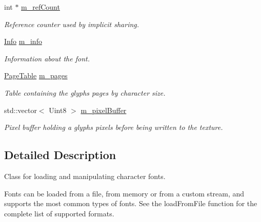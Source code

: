 \begin{DoxyCompactItemize}
int $\ast$ \mbox{\hyperlink{classsf_1_1_font_adc98033870d4eb40872e78eeac4e1c24}{m\+\_\+ref\+Count}}
\begin{DoxyCompactList}\small\item\em Reference counter used by implicit sharing. \end{DoxyCompactList}\item 
\mbox{\label{classsf_1_1_font_a22f08c57808a1621269e6f634cca0307}} 
\mbox{\hyperlink{structsf_1_1_font_1_1_info}{Info}} \mbox{\hyperlink{classsf_1_1_font_a22f08c57808a1621269e6f634cca0307}{m\+\_\+info}}
\begin{DoxyCompactList}\small\item\em Information about the font. \end{DoxyCompactList}\item 
\mbox{\label{classsf_1_1_font_a14350f915f1596032463350fe22eb773}} 
\mbox{\hyperlink{classsf_1_1_font_a1aca3fb29fc050f48949610be1f40a05}{Page\+Table}} \mbox{\hyperlink{classsf_1_1_font_a14350f915f1596032463350fe22eb773}{m\+\_\+pages}}
\begin{DoxyCompactList}\small\item\em Table containing the glyphs pages by character size. \end{DoxyCompactList}\item 
\mbox{\label{classsf_1_1_font_ac151788613511c1c3a91a2ec1f6fa2de}} 
std\+::vector$<$ Uint8 $>$ \mbox{\hyperlink{classsf_1_1_font_ac151788613511c1c3a91a2ec1f6fa2de}{m\+\_\+pixel\+Buffer}}
\begin{DoxyCompactList}\small\item\em Pixel buffer holding a glyph\textquotesingle{}s pixels before being written to the texture. \end{DoxyCompactList}\end{DoxyCompactItemize}


\subsection{Detailed Description}
Class for loading and manipulating character fonts. 

\begin{DoxyVerb}\end{DoxyVerb}


Fonts can be loaded from a file, from memory or from a custom stream, and supports the most common types of fonts. See the load\+From\+File function for the complete list of supported formats.

